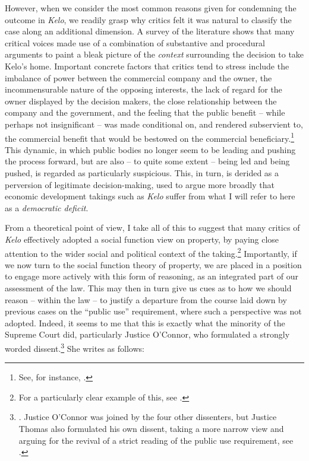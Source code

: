 However, when we consider the most common reasons given for condemning the outcome in {\it Kelo}, we readily grasp why critics felt it was natural to classify the case along an additional dimension. A survey of the literature shows that many critical voices made use of a combination of substantive and procedural arguments to  paint a bleak picture of the {\it context} surrounding the decision to take Kelo's home. Important concrete factors that critics tend to stress include the imbalance of power between the commercial company and the owner, the incommensurable nature of the opposing interests, the lack of regard for the owner displayed by the decision makers, the close relationship between the company and the government, and the feeling that the public benefit -- while perhaps not insignificant -- was made conditional on, and rendered subservient to, the commercial benefit that would be bestowed on the commercial beneficiary.\footnote{See, for instance, \cite{underkuffler06,somin07,sandefur06,cohen06,hafetz09,hudson10}.}  This dynamic, in which public bodies no longer seem to be leading and pushing the process forward, but are also -- to quite some extent -- being led and being pushed, is regarded as particularly suspicious. This, in turn, is derided as a perversion of legitimate decision-making, used to argue more broadly that economic development takings such as {\it Kelo} suffer from what I will refer to here as a {\it democratic deficit}.

From a theoretical point of view, I take all of this to suggest that many critics of {\it Kelo} effectively adopted a social function view on property, by paying close attention to the wider social and political context of the taking.\footnote{For a particularly clear example of this, see \cite{underkuffler06}.} Importantly, if we now turn to the social function theory of property, we are placed in a position to engage more actively with this form of reasoning, as an integrated part of our assessment of the law. This may then in turn give us cues as to how we should reason -- within the law -- to justify a departure from the course laid down by previous cases on the ``public use'' requirement, where such a perspective was not adopted. Indeed, it seems to me that this is exactly what the minority of the Supreme Court did, particularly Justice O'Connor, who formulated a strongly worded dissent.\footnote{\cite[494-505]{kelo05}. Justice O'Connor was joined by the four other dissenters, but Justice Thomas also formulated his own dissent, taking a more narrow view and arguing for the revival of a strict reading of the public use requirement, see \cite[505-523]{kelo05}.} She writes as follows:

